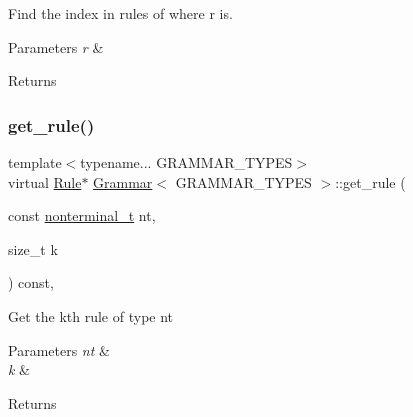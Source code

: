 Find the index in rules of where r is. 
\begin{DoxyParams}{Parameters}
{\em r} & \\
\hline
\end{DoxyParams}
\begin{DoxyReturn}{Returns}

\end{DoxyReturn}
\mbox{\label{class_grammar_a9ed04fb2a2a8e2f0e4f11b711647a02c}} 
\subsubsection{\texorpdfstring{get\+\_\+rule()}{get\_rule()}\hspace{0.1cm}{\footnotesize\ttfamily [1/4]}}
{\footnotesize\ttfamily template$<$typename... G\+R\+A\+M\+M\+A\+R\+\_\+\+T\+Y\+P\+ES$>$ \\
virtual \hyperlink{class_rule}{Rule}$\ast$ \hyperlink{class_grammar}{Grammar}$<$ G\+R\+A\+M\+M\+A\+R\+\_\+\+T\+Y\+P\+ES $>$\+::get\+\_\+rule (\begin{DoxyParamCaption}\item[{const \hyperlink{_nonterminal_8h_a5c1f658dc7560600a16d22408bd716ca}{nonterminal\+\_\+t}}]{nt,  }\item[{size\+\_\+t}]{k }\end{DoxyParamCaption}) const\hspace{0.3cm}{\ttfamily [inline]}, {\ttfamily [virtual]}}

Get the k\textquotesingle{}th rule of type nt 
\begin{DoxyParams}{Parameters}
{\em nt} & \\
\hline
{\em k} & \\
\hline
\end{DoxyParams}
\begin{DoxyReturn}{Returns}

\end{DoxyReturn}
\mbox{\label{class_grammar_a57835af24b91d1c193f2906b43282350}} 
